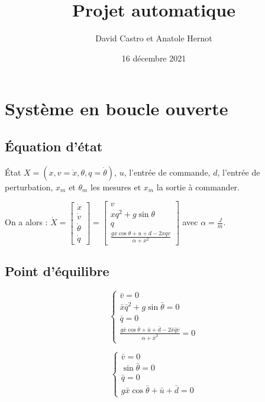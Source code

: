 \documentclass[10pt]{article}
\title{Projet automatique}
\author{David Castro et Anatole Hernot}
\date{16 décembre 2021}
\begin{document}
\maketitle
\theoremstyle{definition}

\section{Système en boucle ouverte}

\subsection*{Équation d'état}

État $X = (x, v = \dot x, \theta, q = \dot{\theta})$, $u$, l'entrée de commande, $d$, l'entrée de perturbation, $x_m$ et $\theta_m$ les mesures et $x_m$ la sortie à commander.

\vspace{10px}

\noindent On a alors :  $\dot X = \begin{bmatrix} \dot x \\ \dot v \\ \dot \theta \\ \dot q \end{bmatrix} =
\begin{bmatrix} v \\ x q^2 + g \sin \theta \\ q \\ \frac{gx \cos \theta + u + d - 2xqv}{\alpha + x^2} \end{bmatrix}$
avec $\alpha = \frac{J}{m}$.

\subsection*{Point d'équilibre}

\[ \begin{cases} \bar v = 0 \\ \bar x \bar q^2 + g \sin \bar{\theta}  = 0 \\ \bar q = 0 \\ \frac{g \bar x \cos \bar{\theta} + \bar u + \bar d - 2 \bar x \bar q \bar v}{\alpha + \bar x^2} = 0 \end{cases} \]

\[ \begin{cases} \bar v = 0 \\ \sin \bar{\theta}  = 0 \\ \bar q = 0 \\ g \bar x \cos \bar{\theta} + \bar u + \bar d = 0 \end{cases} \]
\end{document}
